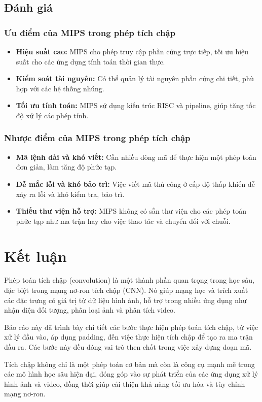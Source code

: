 \documentclass{article}
\begin{document}
\subsection{Đánh giá}
\subsubsection{Ưu điểm của MIPS trong phép tích chập}
\begin{itemize}
	\item \textbf{Hiệu suất cao:} MIPS cho phép truy cập phần cứng trực tiếp, tối ưu hiệu suất cho các ứng dụng tính toán thời gian thực.
	\item \textbf{Kiểm soát tài nguyên:} Có thể quản lý tài nguyên phần cứng chi tiết, phù hợp với các hệ thống nhúng.
	\item \textbf{Tối ưu tính toán:} MIPS sử dụng kiến trúc RISC và pipeline, giúp tăng tốc độ xử lý các phép tính.
\end{itemize}
\subsubsection{Nhược điểm của MIPS trong phép tích chập}
\begin{itemize}
	\item \textbf{Mã lệnh dài và khó viết:} Cần nhiều dòng mã để thực hiện một phép toán đơn giản, làm tăng độ phức tạp.
	\item \textbf{Dễ mắc lỗi và khó bảo trì:} Việc viết mã thủ công ở cấp độ thấp khiến dễ xảy ra lỗi và khó kiểm tra, bảo trì.
	\item \textbf{Thiếu thư viện hỗ trợ:} MIPS không có sẵn thư viện cho các phép toán phức tạp như ma trận hay cho việc thao tác và chuyển đổi với chuỗi.
\end{itemize}
\pagebreak


\section*{Kết luận}
\setcounter{section}{1}\setlength{\baselineskip}{15pt}
\setcounter{subsection}{0}
\setcounter{subsubsection}{0}
\large
\hspace{0.4cm}Phép toán tích chập (convolution) là một thành phần quan trọng trong học sâu, đặc biệt trong mạng nơ-ron tích chập (CNN). Nó giúp mạng học và trích xuất các đặc trưng có giá trị từ dữ liệu hình ảnh, hỗ trợ trong nhiều ứng dụng như nhận diện đối tượng, phân loại ảnh và phân tích video.\medskip

Báo cáo này đã trình bày chi tiết các bước thực hiện phép toán tích chập, từ việc xử lý đầu vào, áp dụng padding, đến việc thực hiện tích chập để tạo ra ma trận đầu ra. Các bước này đều đóng vai trò then chốt trong việc xây dựng đoạn mã.\medskip

Tích chập không chỉ là một phép toán cơ bản mà còn là công cụ mạnh mẽ trong các mô hình học sâu hiện đại, đóng góp vào sự phát triển của các ứng dụng xử lý hình ảnh và video, đồng thời giúp cải thiện khả năng tối ưu hóa và tùy chỉnh mạng nơ-ron.
\end{document}
